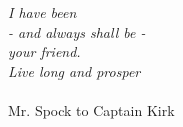 \myemptypage
\begin{titlepage}
	
	\nonumber
	\null {}
	\begin{flushright}
		\textit{I have been \\ 
			- and always shall be - \\
			your friend.\\
			Live long and prosper} \\[5mm]
		
		\ \\
		Mr. Spock to Captain Kirk 
	\end{flushright}
	\null
	
\end{titlepage}
